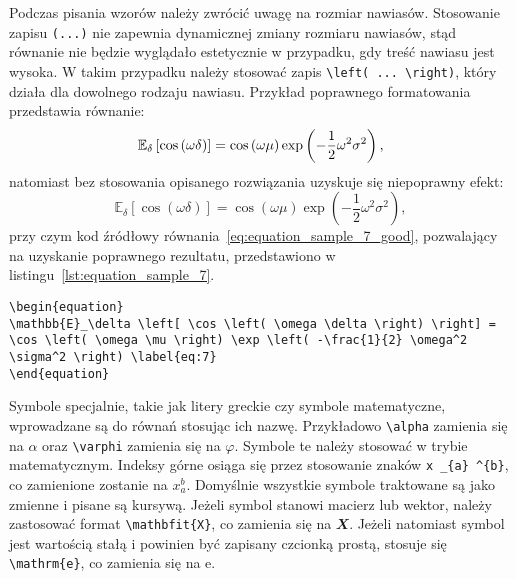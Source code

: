 Podczas pisania wzorów należy zwrócić uwagę na rozmiar nawiasów. Stosowanie zapisu \verb|(...)| nie zapewnia dynamicznej zmiany rozmiaru nawiasów, stąd równanie nie będzie wyglądało estetycznie w przypadku, gdy treść nawiasu jest wysoka. W takim przypadku należy stosować zapis \verb|\left( ... \right)|, który działa dla dowolnego rodzaju nawiasu. Przykład poprawnego formatowania przedstawia równanie:
\begin{equation}
\mathbb{E}_\delta \left[ \cos \left(\omega \delta\right) \right] = \cos \left(\omega \mu\right) \exp \left(-\frac{1}{2} \omega^2 \sigma^2\right) \label{eq:equation_sample_7_good},
\end{equation}
natomiast bez stosowania opisanego rozwiązania uzyskuje się niepoprawny efekt:
\begin{equation}
\mathbb{E}_\delta [ \cos (\omega \delta) ] = \cos (\omega \mu) \exp (-\frac{1}{2} \omega^2 \sigma^2) \label{eq:equation_sample_7_bad},
\end{equation}
przy czym kod źródłowy równania~\eqref{eq:equation_sample_7_good}, pozwalający na uzyskanie poprawnego rezultatu, przedstawiono w listingu~\ref{lst:equation_sample_7}.

\begin{listing}[htb]
\begin{verbatim}
\begin{equation}
\mathbb{E}_\delta \left[ \cos \left( \omega \delta \right) \right] = \cos \left( \omega \mu \right) \exp \left( -\frac{1}{2} \omega^2 \sigma^2 \right) \label{eq:7}
\end{equation}
\end{verbatim}
\end{listing}

Symbole specjalnie, takie jak litery greckie czy symbole matematyczne, wprowadzane są do równań stosując ich nazwę. Przykładowo \verb|\alpha| zamienia się na $\alpha$ oraz \verb|\varphi| zamienia się na $\varphi$. Symbole te należy stosować w trybie matematycznym. Indeksy górne osiąga się przez stosowanie znaków \verb|x _{a} ^{b}|, co zamienione zostanie na $x _{a} ^{b}$. Domyślnie wszystkie symbole traktowane są jako zmienne i pisane są kursywą. Jeżeli symbol stanowi macierz lub wektor, należy zastosować format \verb|\mathbfit{X}|, co zamienia się na $\mathbfit{X}$. Jeżeli natomiast symbol jest wartością stałą i powinien być zapisany czcionką prostą, stosuje się \verb|\mathrm{e}|, co zamienia się na $\mathrm{e}$.

